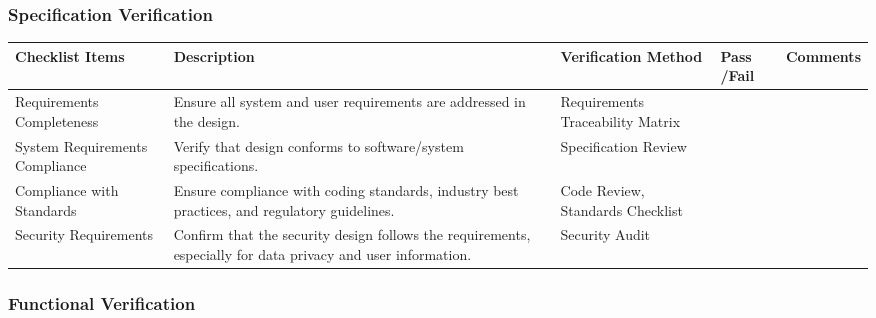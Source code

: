 \documentclass[12pt, titlepage]{article}
\begin{document}



\subsubsection{Specification Verification}

\noindent \begin{tabular}{|>{\raggedright\arraybackslash}p{3cm}|>{\raggedright\arraybackslash}p{4cm}|>{\raggedright\arraybackslash}p{3cm}|p{1cm}|p{2.25cm}|}
	\hline
	\textbf{Checklist Items} & \textbf{Description} & \textbf{Verification Method} & \textbf{Pass /Fail} & \textbf{Comments} \\ 
	\hline
	Requirements Completeness & Ensure all system and user requirements are addressed in the design. & Requirements Traceability Matrix & & \\
	\hline
	System Requirements Compliance & Verify that design conforms to software/system specifications. & Specification Review	& & \\
	\hline
	Compliance with Standards & Ensure compliance with coding standards, industry best practices, and regulatory guidelines. & Code Review, Standards Checklist	& & \\
	\hline
	Security Requirements & Confirm that the security design follows the requirements, especially for data privacy and user information. & Security Audit & & \\
	\hline
\end{tabular}

\newpage

\subsubsection{Functional Verification}
\end{document}
